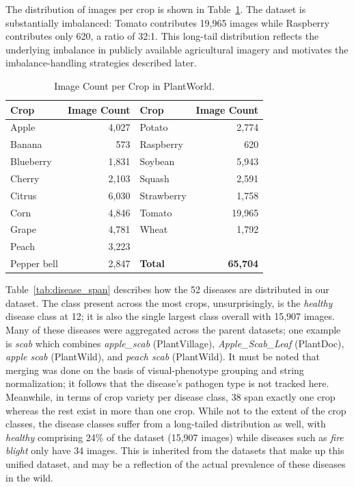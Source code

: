 \documentclass{bmvc2k}
\begin{document}
The distribution of images per crop is shown in Table~\ref{tab:dataset_dist}. The dataset is substantially imbalanced: Tomato contributes 19,965 images while Raspberry contributes only 620, a ratio of 32:1. This long-tail distribution reflects the underlying imbalance in publicly available agricultural imagery and motivates the imbalance-handling strategies described later.

\begin{table}[h]
\begin{center}
\begin{tabular}{|l|r|l|r|}
\hline
Crop & Image Count & Crop & Image Count \\
\hline\hline
Apple       & 4{,}027  & Potato     & 2{,}774  \\
Banana      & 573      & Raspberry  & 620      \\
Blueberry   & 1{,}831  & Soybean    & 5{,}943  \\
Cherry      & 2{,}103  & Squash     & 2{,}591  \\
Citrus      & 6{,}030  & Strawberry & 1{,}758  \\
Corn        & 4{,}846  & Tomato     & 19{,}965 \\
Grape       & 4{,}781  & Wheat      & 1{,}792  \\
Peach       & 3{,}223  &            &          \\
Pepper bell & 2{,}847  & \textbf{Total} & \textbf{65{,}704} \\
\hline
\end{tabular}
\end{center}
\caption{Image Count per Crop in PlantWorld.}
\label{tab:dataset_dist}
\end{table}

Table~\ref{tab:disease_span} describes how the 52 diseases are distributed in our dataset. The class present across the most crops, unsurprisingly, is the {\em healthy} disease class at 12; it is also the single largest class overall with 15,907 images. Many of these diseases were aggregated across the parent datasets; one example is {\em scab} which combines {\em apple\_scab} (PlantVillage), {\em Apple\_Scab\_Leaf} (PlantDoc), {\em apple scab} (PlantWild), and {\em peach scab} (PlantWild). It must be noted that merging was done on the basis of visual-phenotype grouping and string normalization; it follows that the disease's pathogen type is not tracked here. Meanwhile, in terms of crop variety per disease class, 38 span exactly one crop whereas the rest exist in more than one crop. While not to the extent of the crop classes, the disease classes suffer from a long-tailed distribution as well, with {\em healthy} comprising 24\% of the dataset (15,907 images) while diseases such as {\em fire blight} only have 34 images. This is inherited from the datasets that make up this unified dataset, and may be a reflection of the actual prevalence of these diseases in the wild.
\end{document}
